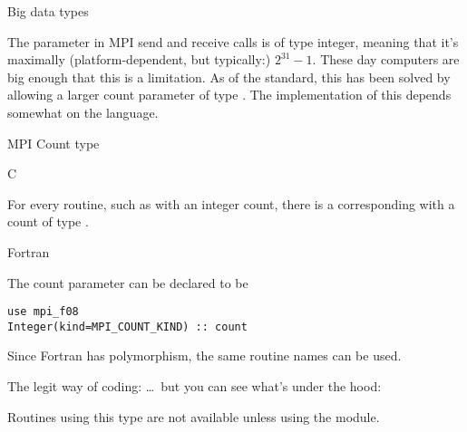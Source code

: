 
 {Big data types}
\label{sec:mpi-bigdata}

The  parameter in MPI send and receive calls is of type integer,
meaning that it's maximally
(platform-dependent, but typically:)
$2^{31}-1$.
These day computers are big enough
that this is a limitation.
As of the  standard, this has been solved by allowing a
larger count parameter of type .
The implementation of this depends somewhat on the language.

\begin{mpifournote}{MPI Count type}

 {C}
\label{sec:c-mpi-count}

For every routine, such as  with an integer count,
there is a corresponding  with a count
of type .


{
\def\snippetcodefraction{.45}
\def\snippetlistfraction{.5}  
}

 {Fortran}
\label{sec:f-largecount}

The count parameter can be declared  to be
\lstset{language=Fortran}
\begin{lstlisting}
use mpi_f08
Integer(kind=MPI_COUNT_KIND) :: count
\end{lstlisting}
\lstset{language=C}
Since Fortran has polymorphism, the same routine names can be used.

\begin{multicols}{2}
  The legit way of coding:
  \lstset{xleftmargin=0pt}
  \columnbreak
  \ldots~but you can see what's under the hood:
  \lstset{xleftmargin=0pt}
\end{multicols}

Routines using this type are not available
unless using the  module.
\end{mpifournote}

